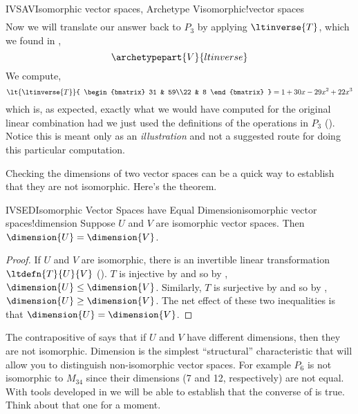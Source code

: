 \begin{example}{IVSAV}{Isomorphic vector spaces, Archetype V}{isomorphic!vector spaces}
\begin{align*}
%
\end{align*}
%
Now we will translate our answer back to $P_3$ by applying $\ltinverse{T}$, which we found in ,
%
\begin{equation*}
\archetypepart{V}{ltinverse}
\end{equation*}
%
We compute,
%
\begin{equation*}
\lt{\ltinverse{T}}{
\begin{bmatrix}
31 & 59\\22 & 8
\end{bmatrix}
}
=1+30x-29x^2+22x^3
\end{equation*}
%
which is, as expected, exactly what we would have computed for the original linear combination had we just used the definitions of the operations in $P_3$ ().  Notice this is meant only as an {\em illustration} and not a suggested route for doing this particular computation.
%
\end{example}
%
Checking the dimensions of two vector spaces can be a quick way to establish that they are not isomorphic.  Here's the theorem.
%
\begin{theorem}{IVSED}{Isomorphic Vector Spaces have Equal Dimension}{isomorphic vector spaces!dimension}
Suppose $U$ and $V$ are isomorphic vector spaces.  Then $\dimension{U}=\dimension{V}$.
\end{theorem}
%
\begin{proof}
If $U$ and $V$ are isomorphic, there is an invertible linear transformation $\ltdefn{T}{U}{V}$ ().  $T$ is injective by  and so by , $\dimension{U}\leq\dimension{V}$.  Similarly, $T$ is surjective by  and so by , $\dimension{U}\geq\dimension{V}$.  The net effect of these two inequalities is that $\dimension{U}=\dimension{V}$.
\end{proof}
%
The contrapositive of  says that if $U$ and $V$ have different dimensions, then they are not isomorphic.  Dimension is the simplest ``structural'' characteristic that will allow you to distinguish non-isomorphic vector spaces.  For example $P_6$ is not isomorphic to $M_{34}$ since their dimensions (7 and 12, respectively) are not equal.  With tools developed in  we will be able to establish that the converse of  is true.  Think about that one for a moment.
%
